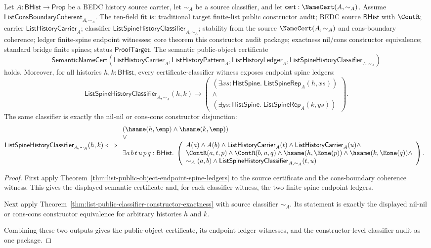 \begin{theorem}
\label{thm:list-public-object-constructor-audit}
Let $A:\mathsf{BHist}\to\mathsf{Prop}$ be a BEDC history source carrier, let
$\sim_A$ be a source classifier, and let
$\mathsf{cert}:\NameCert(A,\sim_A)$. Assume
$\mathsf{ListConsBoundaryCoherent}_{A,\sim_A}$. The ten-field fit is:
traditional target finite-list public constructor audit; BEDC source
$\mathsf{BHist}$ with $\ContR$; carrier $\mathsf{ListHistoryCarrier}_A$;
classifier $\mathsf{ListSpineHistoryClassifier}_{A,\sim_A}$; stability from
the source $\NameCert(A,\sim_A)$ and cons-boundary coherence; ledger finite-spine
endpoint witnesses; core theorem this constructor audit package; exactness nil/cons
constructor equivalence; standard bridge finite spines; status
$\mathsf{ProofTarget}$. The semantic public-object certificate
$$
\mathsf{SemanticNameCert}(\mathsf{ListHistoryCarrier}_A,
\mathsf{ListHistoryPattern}_A,
\mathsf{ListHistoryLedger}_A,
\mathsf{ListSpineHistoryClassifier}_{A,\sim_A})
$$
holds. Moreover, for all histories $h,k:\mathsf{BHist}$, every
certificate-classifier witness exposes endpoint spine ledgers:
$$
\mathsf{ListSpineHistoryClassifier}_{A,\sim_A}(h,k)
\to
\left(
\begin{array}{l}
(\exists xs:\mathsf{HistSpine}.\;\mathsf{ListSpineRep}_A(h,xs))\\
\land\\
(\exists ys:\mathsf{HistSpine}.\;\mathsf{ListSpineRep}_A(k,ys))
\end{array}
\right).
$$
The same classifier is exactly the nil-nil or cons-cons constructor
disjunction:
$$
\mathsf{ListSpineHistoryClassifier}_{A,\sim_A}(h,k)
\Longleftrightarrow
\begin{array}{l}
(\hsame(h,\emp)\land \hsame(k,\emp))\\
\lor\\
\exists a\,b\,t\,u\,p\,q:\mathsf{BHist}.\;
\left(
\begin{array}{l}
A(a)\land A(b)\land
\mathsf{ListHistoryCarrier}_A(t)\land
\mathsf{ListHistoryCarrier}_A(u)\land\\
\ContR(a,t,p)\land \ContR(b,u,q)\land
\hsame(h,\Eone(p))\land \hsame(k,\Eone(q))\land\\
\sim_A(a,b)\land
\mathsf{ListSpineHistoryClassifier}_{A,\sim_A}(t,u)
\end{array}
\right).
\end{array}
$$
\end{theorem}
\begin{proof}
First apply
Theorem~\ref{thm:list-public-object-endpoint-spine-ledgers} to the source
certificate and the cons-boundary coherence witness. This gives the displayed
semantic certificate and, for each classifier witness, the two finite-spine
endpoint ledgers.

Next apply
Theorem~\ref{thm:list-public-classifier-constructor-exactness} with source
classifier $\sim_A$. Its statement is exactly the displayed nil-nil or cons-cons
constructor equivalence for arbitrary histories $h$ and $k$.

Combining these two outputs gives the public-object certificate, its endpoint
ledger witnesses, and the constructor-level classifier audit as one package.
\end{proof}
